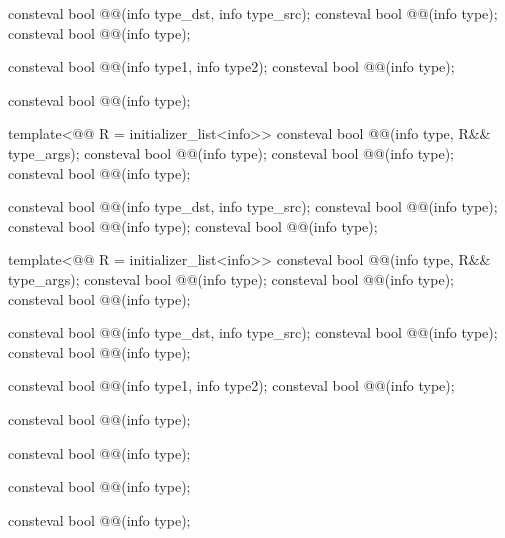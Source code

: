\begin{codeblock}
consteval bool @@(info type_dst, info type_src);
consteval bool @@(info type);
consteval bool @@(info type);

consteval bool @@(info type1, info type2);
consteval bool @@(info type);

consteval bool @@(info type);

template<@@ R = initializer_list<info>>
  consteval bool @@(info type, R&& type_args);
consteval bool @@(info type);
consteval bool @@(info type);
consteval bool @@(info type);

consteval bool @@(info type_dst, info type_src);
consteval bool @@(info type);
consteval bool @@(info type);
consteval bool @@(info type);

template<@@ R = initializer_list<info>>
  consteval bool @@(info type, R&& type_args);
consteval bool @@(info type);
consteval bool @@(info type);
consteval bool @@(info type);

consteval bool @@(info type_dst, info type_src);
consteval bool @@(info type);
consteval bool @@(info type);

consteval bool @@(info type1, info type2);
consteval bool @@(info type);

consteval bool @@(info type);

consteval bool @@(info type);

consteval bool @@(info type);

consteval bool @@(info type);


\end{codeblock}
